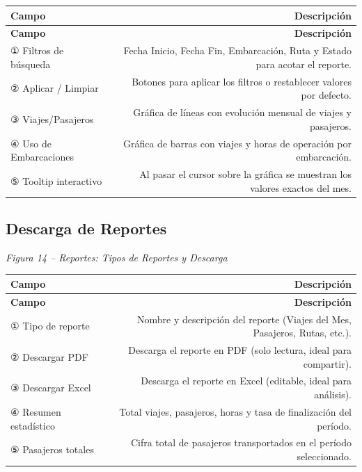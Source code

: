 \documentclass[12pt,a4paper]{article}
\begin{document}
\begin{longtable}{LR}
  \toprule
  \textbf{Campo} & \textbf{Descripción} \\
  \midrule
  \endfirsthead
  \toprule
  \textbf{Campo} & \textbf{Descripción} \\
  \midrule
  \endhead
  \bottomrule
  \endfoot
  ① Filtros de búsqueda  & Fecha Inicio, Fecha Fin, Embarcación, Ruta y Estado para acotar el reporte. \\[4pt]
  ② Aplicar / Limpiar    & Botones para aplicar los filtros o restablecer valores por defecto. \\[4pt]
  ③ Viajes/Pasajeros     & Gráfica de líneas con evolución mensual de viajes y pasajeros. \\[4pt]
  ④ Uso de Embarcaciones & Gráfica de barras con viajes y horas de operación por embarcación. \\[4pt]
  ⑤ Tooltip interactivo  & Al pasar el cursor sobre la gráfica se muestran los valores exactos del mes. \\
\end{longtable}

\subsection{Descarga de Reportes}

\textit{Figura 14 -- Reportes: Tipos de Reportes y Descarga}

\begin{longtable}{LR}
  \toprule
  \textbf{Campo} & \textbf{Descripción} \\
  \midrule
  \endfirsthead
  \toprule
  \textbf{Campo} & \textbf{Descripción} \\
  \midrule
  \endhead
  \bottomrule
  \endfoot
  ① Tipo de reporte      & Nombre y descripción del reporte (Viajes del Mes, Pasajeros, Rutas, etc.). \\[4pt]
  ② Descargar PDF        & Descarga el reporte en PDF (solo lectura, ideal para compartir). \\[4pt]
  ③ Descargar Excel      & Descarga el reporte en Excel (editable, ideal para análisis). \\[4pt]
  ④ Resumen estadístico  & Total viajes, pasajeros, horas y tasa de finalización del período. \\[4pt]
  ⑤ Pasajeros totales    & Cifra total de pasajeros transportados en el período seleccionado. \\
\end{longtable}
\end{document}
